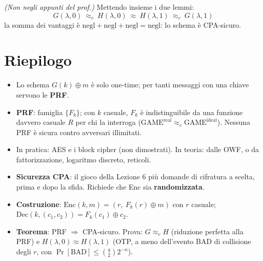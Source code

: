 \emph{(Non negli appunti del prof.)} Mettendo insieme i due lemmi:
\[
G(\lambda, 0) \ \approx_c\ H(\lambda, 0) \ \approx\ H(\lambda, 1) \ \approx_c\ G(\lambda, 1)
\]
la somma dei vantaggi è \(\text{negl} + \text{negl} + \text{negl} = \text{negl}\): lo schema è CPA-sicuro.

\section{Riepilogo}

\begin{itemize}
  \item Lo schema \(G(k) \oplus m\) è solo one-time; per tanti messaggi con una chiave servono le \textbf{PRF}.
  \item \textbf{PRF}: famiglia \(\{F_k\}\); con \(k\) casuale, \(F_k\) è indistinguibile da una funzione davvero casuale \(R\) per chi la interroga (\(\text{GAME}^{\text{real}} \approx_c \text{GAME}^{\text{ideal}}\)). Nessuna PRF è sicura contro avversari illimitati.
  \item In pratica: AES e i block cipher (non dimostrati). In teoria: dalle OWF, o da fattorizzazione, logaritmo discreto, reticoli.
  \item \textbf{Sicurezza CPA}: il gioco della Lezione 6 più domande di cifratura a scelta, prima e dopo la sfida. Richiede che Enc sia \textbf{randomizzata}.
  \item \textbf{Costruzione}: \(\text{Enc}(k, m) = (r,\ F_k(r) \oplus m)\) con \(r\) casuale; \(\text{Dec}(k, (c_1, c_2)) = F_k(c_1) \oplus c_2\).
  \item \textbf{Teorema}: PRF \(\Rightarrow\) CPA-sicuro. Prova: \(G \approx_c H\) (riduzione perfetta alla PRF) e \(H(\lambda, 0) \approx H(\lambda, 1)\) (OTP, a meno dell'evento BAD di collisione degli \(r\), con \(\Pr[\text{BAD}] \le \binom{q}{2} 2^{-n}\)).
\end{itemize}
